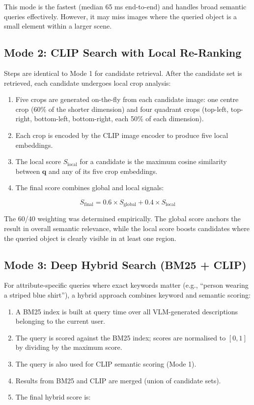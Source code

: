 \documentclass[12pt,a4paper,oneside]{report}
\begin{document}
This mode is the fastest (median 65 ms end-to-end) and handles broad semantic queries effectively. However, it may miss images where the queried object is a small element within a larger scene.

\subsection{Mode 2: CLIP Search with Local Re-Ranking}

Steps are identical to Mode 1 for candidate retrieval. After the candidate set is retrieved, each candidate undergoes local crop analysis:

\begin{enumerate}[leftmargin=*]
  \item Five crops are generated on-the-fly from each candidate image: one centre crop (60\% of the shorter dimension) and four quadrant crops (top-left, top-right, bottom-left, bottom-right, each 50\% of each dimension).
  \item Each crop is encoded by the CLIP image encoder to produce five local embeddings.
  \item The local score $S_{\text{local}}$ for a candidate is the maximum cosine similarity between $\mathbf{q}$ and any of its five crop embeddings.
  \item The final score combines global and local signals:
\end{enumerate}

\begin{equation}
  S_{\text{final}} = 0.6 \times S_{\text{global}} + 0.4 \times S_{\text{local}}
  \label{eq:rerank}
\end{equation}

The 60/40 weighting was determined empirically. The global score anchors the result in overall semantic relevance, while the local score boosts candidates where the queried object is clearly visible in at least one region.

\subsection{Mode 3: Deep Hybrid Search (BM25 + CLIP)}

For attribute-specific queries where exact keywords matter (e.g., ``person wearing a striped blue shirt''), a hybrid approach combines keyword and semantic scoring:

\begin{enumerate}[leftmargin=*]
  \item A BM25 index is built at query time over all VLM-generated descriptions belonging to the current user.
  \item The query is scored against the BM25 index; scores are normalised to $[0, 1]$ by dividing by the maximum score.
  \item The query is also used for CLIP semantic scoring (Mode 1).
  \item Results from BM25 and CLIP are merged (union of candidate sets).
  \item The final hybrid score is:
\end{enumerate}
\end{document}
